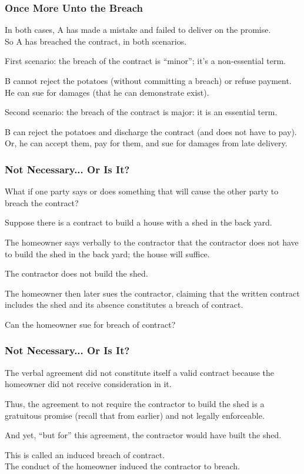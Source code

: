 \begin{frame}
\frametitle{Once More Unto the Breach}

In both cases, A has made a mistake and failed to deliver on the promise.\\
\quad So A has breached the contract, in both scenarios.

First scenario: the breach of the contract is ``minor''; it's a non-essential term.

B cannot reject the potatoes (without committing a breach) or refuse payment.\\
\quad He can sue for damages (that he can demonstrate exist).

Second scenario: the breach of the contract is major: it is an essential term.

B can reject the potatoes and discharge the contract (and does not have to pay).\\
\quad Or, he can accept them, pay for them, and sue for damages from late delivery.

\end{frame}




\begin{frame}
\frametitle{Not Necessary... Or Is It?}

What if one party says or does something that will cause the other party to breach the contract?

Suppose there is a contract to build a house with a shed in the back yard.

The homeowner says verbally to the contractor that the contractor does not have to build the shed in the back yard; the house will suffice.

The contractor does not build the shed.

The homeowner then later sues the contractor, claiming that the written contract includes the shed and its absence constitutes a breach of contract.

Can the homeowner sue for breach of contract?

\end{frame}



\begin{frame}
\frametitle{Not Necessary... Or Is It?}

The verbal agreement did not constitute itself a valid contract because the homeowner did not receive consideration in it.

Thus, the agreement to not require the contractor to build the shed is a gratuitous promise (recall that from earlier) and not legally enforceable.

And yet, ``but for'' this agreement, the contractor would have built the shed.

This is called an \alert{induced breach} of contract.\\
\quad The conduct of the homeowner induced the contractor to breach.

\end{frame}



